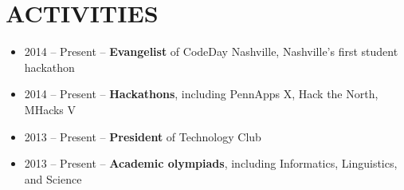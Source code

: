 \documentclass{res}
\begin{document}
\section{ACTIVITIES}

\begin{itemize}[leftmargin=8pt]
  \item 2014 -- Present -- \textbf{Evangelist} of CodeDay Nashville, Nashville's first student hackathon
  \item 2014 -- Present -- \textbf{Hackathons}, including PennApps X, Hack the North, MHacks V
  \item 2013 -- Present -- \textbf{President} of Technology Club
  \item 2013 -- Present -- \textbf{Academic olympiads}, including Informatics, Linguistics, and Science
\end{itemize}
\end{document}
